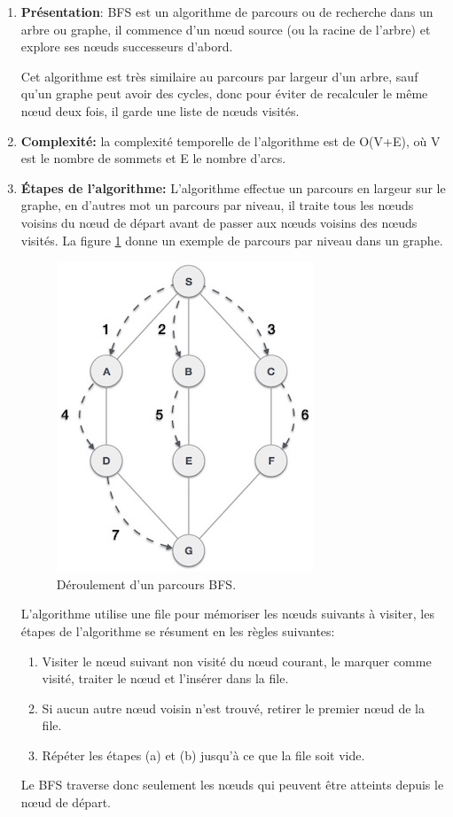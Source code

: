 \begin{enumerate}
	\item \textbf{Présentation}: BFS\cite{refBFS} est un algorithme de parcours ou de recherche dans un arbre ou graphe, il commence d'un nœud source (ou la racine de l'arbre) et explore ses nœuds successeurs d'abord.

Cet algorithme est très similaire au parcours par largeur d'un arbre, sauf qu'un graphe peut avoir des cycles, donc pour éviter de recalculer le même nœud deux fois, il garde une liste de nœuds visités.

	\item \textbf{Complexité:} la complexité temporelle de l'algorithme est de O(V+E), où V est le nombre de sommets et E le nombre d'arcs.
	
	\item \textbf{Étapes de l'algorithme:}
		L'algorithme effectue un parcours en largeur sur le graphe, en d'autres mot un parcours par niveau, il traite tous les nœuds voisins du nœud de départ avant de passer aux nœuds voisins des nœuds visités. La figure \ref{fig:bfs} donne un exemple de parcours par niveau dans un graphe.\\
\begin{figure}
	\center
	\includegraphics[scale=0.6]{img/BFS.jpg}
	\caption{Déroulement d'un parcours BFS.}
	\label{fig:bfs}
\end{figure}		
L'algorithme utilise une file pour mémoriser les nœuds suivants à visiter, les étapes de l'algorithme se résument en les règles suivantes:
	\begin{enumerate}
		\item Visiter le nœud suivant non visité du nœud courant, le marquer comme visité, traiter le nœud et l'insérer dans la file.
		\item Si aucun autre nœud voisin n'est trouvé, retirer le premier nœud de la file.
		\item Répéter les étapes (a) et (b) jusqu'à ce que la file soit vide.
	\end{enumerate}
	Le BFS traverse donc seulement les nœuds qui peuvent être atteints depuis le nœud de départ.
\end{enumerate}

